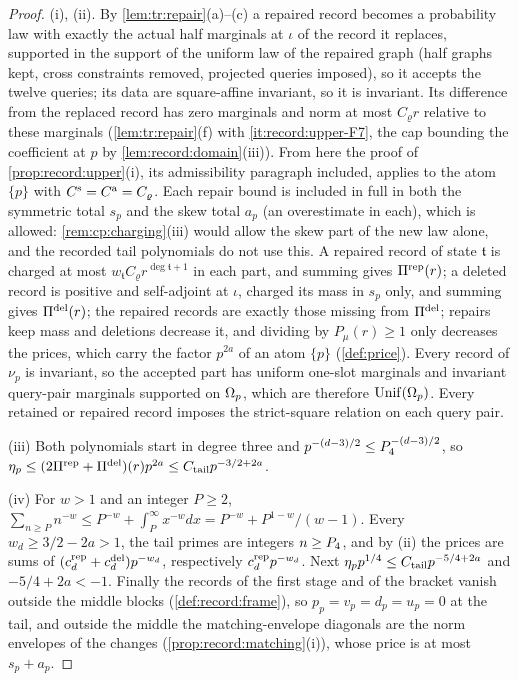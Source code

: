 \begin{proof}
(i), (ii). By \cref{lem:tr:repair}(a)--(c) a repaired record becomes a
probability law with exactly the actual half marginals at $\iota$ of the
record it replaces, supported in the support of the uniform law of the
repaired graph (half graphs kept, cross constraints removed, projected
queries imposed), so it accepts the twelve queries; its data are
square-affine invariant, so it is invariant. Its difference from the
replaced record has zero marginals and norm at most $C_\varrho r$ relative to
these marginals (\cref{lem:tr:repair}(f) with \ref{it:record:upper-F7}, the
cap bounding the coefficient at $p$ by \cref{lem:record:domain}(iii)). From
here the proof of \cref{prop:record:upper}(i), its admissibility paragraph
included, applies to the atom $\{p\}$ with $C^{\rm s}=C^{\rm a}=C_\varrho$.
Each repair bound is included in full in both the symmetric
total $s_p$ and the skew total $a_p$ (an overestimate in each),
which is allowed:
\cref{rem:cp:charging}(iii) would allow the skew part of the new law alone,
and the recorded tail polynomials do not use this. A repaired record of
state $\mathfrak t$ is charged at most $w_{\mathfrak t}C_\varrho
r^{\deg\mathfrak t+1}$ in each part, and summing gives $\Pi^{\rm rep}(r)$; a
deleted record is positive and self-adjoint at $\iota$, charged its mass in
$s_p$ only, and summing gives $\Pi^{\rm del}(r)$; the repaired records are
exactly those missing from $\Pi^{\rm del}$; repairs keep mass and deletions
decrease it, and dividing by $P_\mu(r)\ge1$ only decreases the prices, which
carry the factor $p^{2a}$ of an atom $\{p\}$ (\cref{def:price}). Every record
of $\nu_p$ is invariant, so the accepted part has uniform one-slot marginals
and invariant query-pair marginals supported on $\Omega_{p}$, which are therefore
$\operatorname{Unif}(\Omega_{p})$. Every retained or repaired record imposes the strict-square
relation on each query pair.

(iii) Both polynomials start in degree three and $p^{-(d-3)/2}\le
P_4^{-(d-3)/2}$, so $\eta_p\le(2\Pi^{\rm rep}+\Pi^{\rm del})(r)p^{2a}\le
C_{\rm tail}p^{-3/2+2a}$.

(iv) For $w>1$ and an integer $P\ge2$, $\sum_{n\ge P}n^{-w}\le
P^{-w}+\int_P^\infty x^{-w}dx=P^{-w}+P^{1-w}/(w-1)$. Every $w_d\ge3/2-2a>1$,
the tail primes are integers $n\ge P_4$, and by (ii) the prices are sums
of $(c^{\rm rep}_d+c^{\rm del}_d)p^{-w_d}$, respectively $c^{\rm rep}_dp^{-w_d}$.
Next $\eta_pp^{1/4}\le C_{\rm tail}p^{-5/4+2a}$ and $-5/4+2a<-1$. Finally the
records of the first stage and of the bracket vanish outside the middle blocks
(\cref{def:record:frame}), so $p_p=v_p=d_p=u_p=0$ at the tail, and outside the
middle the
matching-envelope diagonals are the norm envelopes of the changes
(\cref{prop:record:matching}(i)), whose price is at most $s_p+a_p$.
\end{proof}

